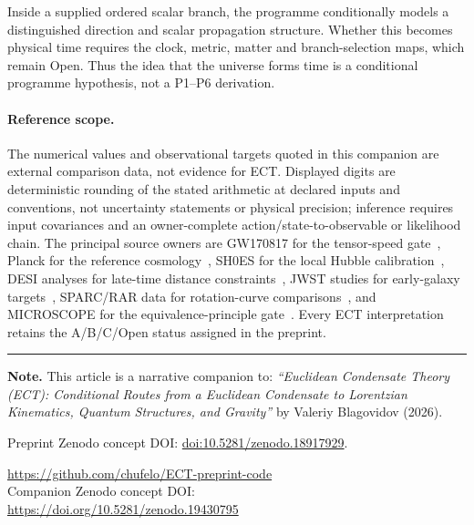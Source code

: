 \documentclass[11pt,a4paper]{article}
\begin{document}
Inside a supplied ordered scalar branch, the programme conditionally models a distinguished direction and scalar propagation structure. Whether this becomes physical time requires the clock, metric, matter and branch-selection maps, which remain Open. Thus the idea that the universe forms time is a conditional programme hypothesis, not a P1--P6 derivation.

\paragraph{Reference scope.}
The numerical values and observational targets quoted in this companion are
external comparison data, not evidence for ECT.  Displayed digits are
deterministic rounding of the stated arithmetic at declared inputs and
conventions, not uncertainty statements or physical precision; inference
requires input covariances and an owner-complete action/state-to-observable or
likelihood chain.  The principal source owners
are GW170817 for the tensor-speed gate~\cite{LIGO_Virgo_GW170817_2017},
Planck for the reference cosmology~\cite{Planck2018}, SH0ES for the local
Hubble calibration~\cite{Riess2022}, DESI analyses for late-time distance
constraints~\cite{DESIDR2_2025,Lodha2025}, JWST studies for early-galaxy
targets~\cite{Bunker2023,Carniani2024}, SPARC/RAR data for rotation-curve
comparisons~\cite{Lelli2016,McGaugh2016}, and MICROSCOPE for the
equivalence-principle gate~\cite{MICROSCOPE2022}.  Every ECT interpretation
retains the A/B/C/Open status assigned in the preprint.

\renewcommand{\refname}{Selected references and data sources}



\vspace{2em}
\noindent\rule{\textwidth}{0.5pt}

\noindent\textbf{Note.}
This article is a narrative companion to:
\emph{``Euclidean Condensate Theory (ECT): Conditional Routes from a
Euclidean Condensate to Lorentzian Kinematics, Quantum Structures, and
Gravity''} by Valeriy Blagovidov (2026).

\medskip
\noindent
Preprint Zenodo concept DOI:
\href{https://doi.org/10.5281/zenodo.18917929}{doi:10.5281/zenodo.18917929}.

\medskip
\begin{center}
\url{https://github.com/chufelo/ECT-preprint-code}\\[0.75em]
Companion Zenodo concept DOI:\\
\url{https://doi.org/10.5281/zenodo.19430795}
\end{center}
\end{document}
